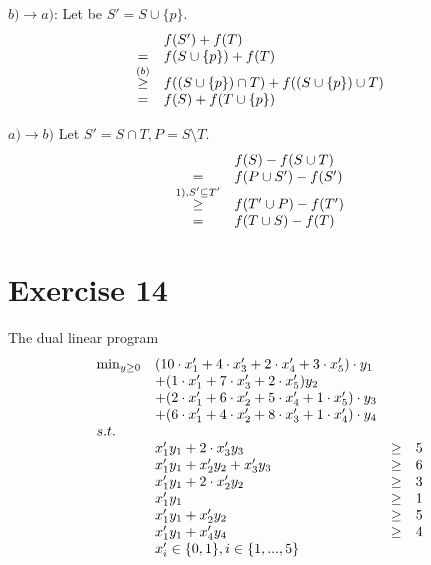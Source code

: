 \documentclass[10pt]{article}
\begin{document}
$b) \rightarrow a)$:
Let be $S'=S\cup \{p\}$.
\begin{displaymath}
  \begin{array}{c l }
    & f(S') + f(T)  \\
    = & f(S\cup \{p\}) + f(T) \\
    \overset{(b)}{\geq} & f((S\cup\{p\}) \cap T) + f((S\cup \{p\}) \cup T) \\
    = & f(S) + f(T\cup \{p\}) \\
  \end{array}
\end{displaymath}

$a) \rightarrow b)$
Let $S'=S\cap T, P=S\setminus T$.
\begin{displaymath}
  \begin{array}{c l}
    & f(S)-f(S\cup T) \\
    = & f(P\cup S') - f(S') \\
    \overset{1), S'\subseteq T'}{\geq} & f(T'\cup P) - f(T') \\
    = & f(T\cup S)-f(T)
  \end{array}
\end{displaymath}


\section*{Exercise 14}
The dual linear program
\begin{displaymath}
  \begin{array}{l l c r }
    \min_{y\geq0}&  (10 \cdot x'_1 + 4\cdot x'_3 + 2\cdot x'_4 + 3\cdot
    x'_5)\cdot y_1  && \\
    &+(1 \cdot x'_1 + 7\cdot x'_3 +  2\cdot x'_5)y_2  && \\
    &+(2 \cdot x'_1 + 6\cdot x'_2 + 5\cdot x'_4 + 1\cdot x'_5)\cdot y_3 && \\
    &+(6 \cdot x'_1 + 4\cdot x'_2 + 8\cdot x'_3 + 1\cdot x'_4)\cdot y_4 && \\
    s.t.& && \\
    & x'_1 y_1 + 2\cdot x'_3 y_3 &\geq& 5  \\
    & x'_1 y_1 + x'_2 y_2 + x'_3 y_3 &\geq& 6 \\
    & x'_1 y_1 + 2\cdot x'_2 y_2 & \geq & 3 \\
    & x'_1 y_1                   & \geq & 1 \\
    & x'_1 y_1 + x'_2 y_2        & \geq & 5 \\
    & x'_1 y_1 + x'_4 y_4        & \geq & 4 \\
    & x'_i \in\{0,1\}, i \in \{1,...,5\} &&
  \end{array}
\end{displaymath}
\end{document}
